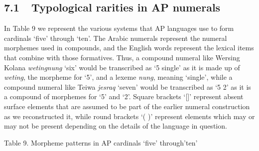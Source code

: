\subsection[7.1\ \ Typological rarities in AP numerals ]{7.1\ \ Typological rarities in AP numerals }
In Table 9 we represent the various systems that AP languages use to form cardinals {\textquoteleft}five{\textquoteright} through {\textquoteleft}ten{\textquoteright}. The Arabic numerals represent the numeral morphemes used in compounds, and the English words represent the lexical items that combine with those formatives. Thus, a compound numeral like Wersing Kolana \textit{wetingnung}  {\textquoteleft}six{\textquoteright} would be transcribed as {\textquoteleft}5 single{\textquoteright} as it is made up of \textit{weting}, the morpheme for {\textquoteleft}5{\textquoteright}, and a lexeme \textit{nung}, meaning {\textquoteleft}single{\textquoteright}, while a compound numeral like Teiwa \textit{jesraq} {\textquoteleft}seven{\textquoteright} would be transcribed as {\textquoteleft}5 2{\textquoteright} as it is a compound of morphemes for {\textquoteleft}5{\textquoteright} and {\textquoteleft}2{\textquoteright}.  Square brackets {\textquoteleft}[]{\textquoteright} represent absent surface elements that are 
assumed to be part of the earlier numeral construction as we reconstructed it, while round brackets {\textquoteleft}( ){\textquoteright} represent elements which may or may not be present depending on the details of the language in question.

{\centering
Table 9. Morpheme patterns in AP cardinals {\textquoteleft}five{\textquoteright} through{\textquoteright}ten{\textquoteright}
\par}

